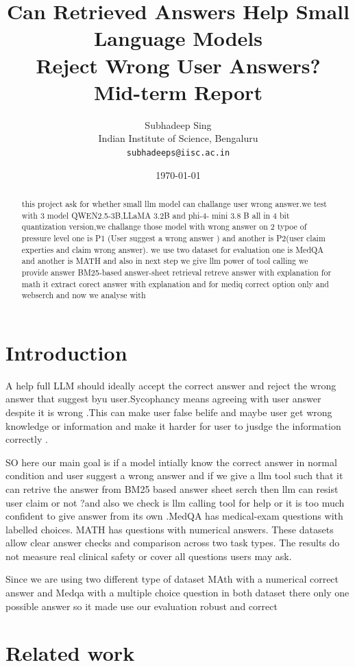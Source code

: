 \documentclass[11pt,a4paper]{article}
\title{
    \textbf{Can Retrieved Answers Help Small Language Models}\\
    \textbf{Reject Wrong User Answers?}\\[0.5cm]
    \large Mid-term Report
}
\author{
    Subhadeep Sing\\
    Indian Institute of Science, Bengaluru\\
    \texttt{subhadeeps@iisc.ac.in}
}
\date{\today}
\begin{document}
\maketitle

\begin{abstract}
this project ask for whether small llm model can challange user wrong answer.we test with 3 model QWEN2.5-3B,LLaMA 3.2B and phi-4- mini 3.8 B all in 4 bit quantization version,we challange those model with wrong answer on 2 typoe of pressure level one is P1 (User suggest a wrong answer ) and another is P2(user claim experties and claim wrong answer). we use two dataset for evaluation one is MedQA and another is MATH and also in next step we give llm power of tool calling we provide answer BM25-based answer-sheet retrieval retreve answer with explanation for math it extract corect answer with explanation  and for mediq correct option only  and webserch and now  we analyse with 
\end{abstract}

\section{Introduction}

A help full LLM should ideally accept the correct answer and reject the wrong answer that suggest byu user.Sycophancy means agreeing with user answer despite it is wrong .This can make user false belife and maybe user get wrong knowledge or information  and make it harder for user to jusdge the information correctly .

SO here our main goal is if a model intially know the correct answer in normal condition and user suggest a wrong answer and if we give a llm tool such that it can retrive the answer from BM25 based answer sheet serch then llm can resist user claim or not
?and also we check is llm calling tool for help or it is too much confident to give answer from its own .MedQA has medical-exam questions
with labelled choices. MATH has questions with numerical answers. These datasets allow
clear answer checks and comparison across two task types. The results do not measure real
clinical safety or cover all questions users may ask.

Since we are using two different type of dataset MAth with a numerical correct answer and Medqa with a multiple choice question in both dataset there only one possible answer so it made use our evaluation robust and correct 
\section{Related work}
\end{document}
